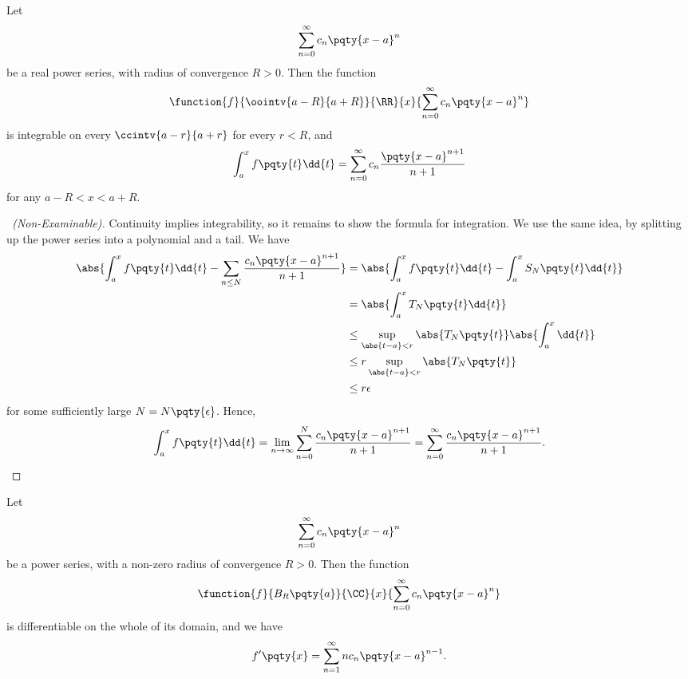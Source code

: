 \begin{proposition}
    \label{prop:integrability-of-power-series-term-by-term}%
    Let
    \[
        \sum_{n = 0}^{\infty} c_n \pqty{x - a}^n
    \]
    be a real power series, with radius of convergence \(R > 0\). Then the function
    \[
        \function{f}{\oointv{a - R}{a + R}}{\RR}{x}{\sum_{n = 0}^{\infty} c_n \pqty{x - a}^n}  
    \]
    is integrable on every \(\ccintv{a - r}{a + r}\) for every \(r < R\), and
    \[
        \int_{a}^{x} f\pqty{t} \dd{t} = \sum_{n = 0}^{\infty} c_n \frac{\pqty{x - a}^{n + 1}}{n + 1}
    \]
    for any \(a - R < x < a + R\).
\end{proposition}

\begin{proof}[\proofname\ (Non-Examinable)]
    Continuity implies integrability, so it remains to show the formula for integration. We use the same idea, by splitting up the power series into a polynomial and a tail. We have
    \begin{align*}
        \abs{\int_{a}^{x} f\pqty{t} \dd{t} - \sum_{n \leq N} \frac{c_n \pqty{x - a}^{n + 1}}{n + 1}} &= \abs{\int_{a}^{x} f\pqty{t} \dd{t} - \int_{a}^{x} S_N\pqty{t} \dd{t}} \\
        &= \abs{\int_{a}^{x} T_N\pqty{t} \dd{t}} \\
        &\leq \sup_{\abs{t - a} < r} \abs{T_N \pqty{t}} \abs{\int_{a}^{x} \dd{t}} \\
        &\leq r \sup_{\abs{t - a} < r} \abs{T_N \pqty{t}} \\
        &\leq r \epsilon
    \end{align*}
    for some sufficiently large \(N = N\pqty{\epsilon}\). Hence,
    \[
        \int_{a}^{x} f\pqty{t} \dd{t} = \lim_{n \to \infty} \sum_{n = 0}^{N} \frac{c_n \pqty{x - a}^{n + 1}}{n + 1} = \sum_{n = 0}^{\infty} \frac{c_n \pqty{x - a}^{n + 1}}{n + 1}.
    \]
\end{proof}

\begin{proposition}
    \label{prop:differentiability-of-power-series-term-by-term}%
    Let
    \[
        \sum_{n = 0}^{\infty} c_n \pqty{x - a}^{n}
    \]
    be a power series, with a non-zero radius of convergence \(R > 0\). Then the function
    \[
        \function{f}{B_R \pqty{a}}{\CC}{x}{\sum_{n = 0}^{\infty} c_n \pqty{x - a}^n}
    \]
    is differentiable on the whole of its domain, and we have
    \[
        f'\pqty{x} = \sum_{n = 1}^{\infty} n c_n \pqty{x - a}^{n - 1}.
    \]
\end{proposition}

